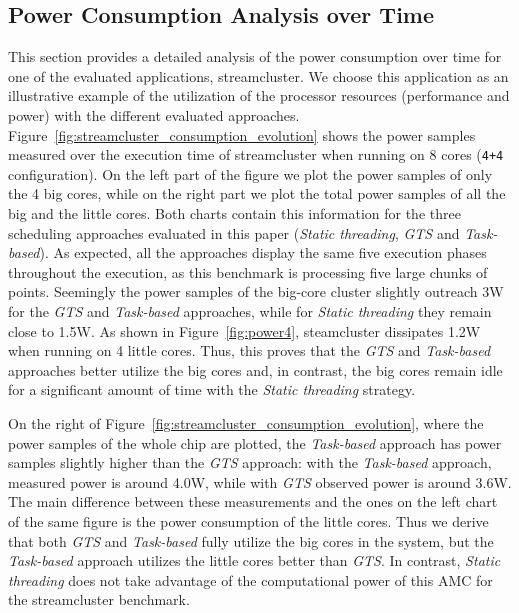 \subsection{Power Consumption Analysis over Time}


This section provides a detailed analysis of the power consumption over time for one of the evaluated applications, streamcluster.
We choose this application as an illustrative example of the utilization of the processor resources 
(performance and power) with the different evaluated approaches.
Figure~\ref{fig:streamcluster_consumption_evolution} shows the power samples measured over the 
execution time of streamcluster when running on 8 cores (\texttt{4+4} configuration).
On the left part of the figure we plot the power samples of only the 4 big cores, while on the right part we plot the total power samples of all the big and the little cores.
Both charts contain this information for the three scheduling approaches evaluated in this paper (\emph{Static threading}, \emph{GTS} and \emph{Task-based}).
As expected, all the approaches display the same five execution phases throughout the execution, as this benchmark is processing five large chunks of points.
Seemingly the power samples of the big-core cluster slightly outreach 3W for the \emph{GTS} and \emph{Task-based} approaches, while for \emph{Static threading} they remain close to 1.5W. As shown in Figure~\ref{fig:power4}, steamcluster dissipates 1.2W when running on 4 little cores.
Thus, this proves that the \emph{GTS} and \emph{Task-based} approaches better utilize the big cores and, in contrast, the big cores remain idle for a significant amount of time with the \emph{Static threading} strategy.

On the right of Figure~\ref{fig:streamcluster_consumption_evolution}, where the power samples of the whole chip are plotted, the \emph{Task-based} approach has power samples slightly higher than the \emph{GTS} approach:
with the \emph{Task-based} approach, measured power is around 4.0W, while with \emph{GTS} observed power is around 3.6W.
The main difference between these measurements and the ones on the left chart of the same figure is the power consumption of the little cores. 
Thus we derive that both \emph{GTS} and \emph{Task-based} fully utilize the big cores in the system, but the \emph{Task-based} approach utilizes the little cores better than \emph{GTS}. In contrast, \emph{Static threading} does not take advantage of the computational power of this AMC for the streamcluster benchmark.

